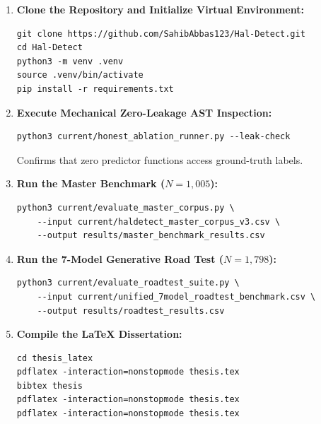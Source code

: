 \begin{enumerate}
    \item \textbf{Clone the Repository and Initialize Virtual Environment:}
\begin{verbatim}
git clone https://github.com/SahibAbbas123/Hal-Detect.git
cd Hal-Detect
python3 -m venv .venv
source .venv/bin/activate
pip install -r requirements.txt
\end{verbatim}

    \item \textbf{Execute Mechanical Zero-Leakage AST Inspection:}
\begin{verbatim}
python3 current/honest_ablation_runner.py --leak-check
\end{verbatim}
    Confirms that zero predictor functions access ground-truth labels.

    \item \textbf{Run the Master Benchmark ($N=1{,}005$):}
\begin{verbatim}
python3 current/evaluate_master_corpus.py \
    --input current/haldetect_master_corpus_v3.csv \
    --output results/master_benchmark_results.csv
\end{verbatim}

    \item \textbf{Run the 7-Model Generative Road Test ($N=1,798$):}
\begin{verbatim}
python3 current/evaluate_roadtest_suite.py \
    --input current/unified_7model_roadtest_benchmark.csv \
    --output results/roadtest_results.csv
\end{verbatim}

    \item \textbf{Compile the LaTeX Dissertation:}
\begin{verbatim}
cd thesis_latex
pdflatex -interaction=nonstopmode thesis.tex
bibtex thesis
pdflatex -interaction=nonstopmode thesis.tex
pdflatex -interaction=nonstopmode thesis.tex
\end{verbatim}
\end{enumerate}

